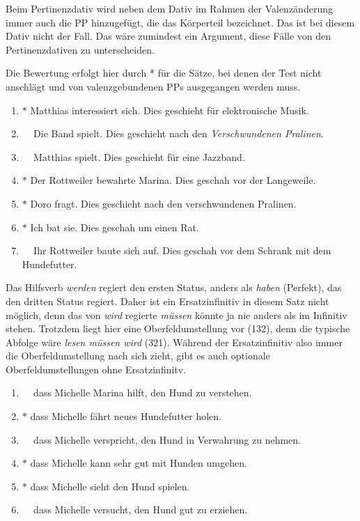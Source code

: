 \label{sol:relationenundpraedikate05}

Beim Pertinenzdativ wird neben dem Dativ im Rahmen der Valenzänderung immer auch die PP hinzugefügt, die das Körperteil bezeichnet.
Das ist bei diesem Dativ nicht der Fall.
Das wäre zumindest ein Argument, diese Fälle von den Pertinenzdativen zu unterscheiden.

\label{sol:relationenundpraedikate06}

Die Bewertung erfolgt hier durch * für die Sätze, bei denen der Test nicht anschlägt und von valenzgebundenen PPs ausgegangen werden muss.

\begin{enumerate}
  \item $*$ Matthias interessiert sich. Dies geschieht für elektronische Musik.
  \item $\phantom{*}$ Die Band spielt. Dies geschieht nach den \textit{Verschwundenen Pralinen}.
  \item $\phantom{*}$ Matthias spielt. Dies geschieht für eine Jazzband.
  \item $*$ Der Rottweiler bewahrte Marina. Dies geschah vor der Langeweile.
  \item $*$ Doro fragt. Dies geschieht nach den verschwundenen Pralinen.
  \item $*$ Ich bat sie. Dies geschah um einen Rat.
  \item $\phantom{*}$ Ihr Rottweiler baute sich auf. Dies geschah vor dem Schrank mit dem Hundefutter.
\end{enumerate}

\label{sol:relationenundpraedikate07}

Das Hilfsverb \textit{werden} regiert den ersten Status, anders als \textit{haben} (Perfekt), das den dritten Status regiert.
Daher ist ein Ersatzinfinitiv in diesem Satz nicht möglich, denn das von \textit{wird} regierte \textit{müssen} könnte ja nie anders als im Infinitiv stehen.
Trotzdem liegt hier eine Oberfeldumstellung vor (132), denn die typische Abfolge wäre \textit{lesen müssen wird} (321).
Während der Ersatzinfinitiv also immer die Oberfeldumstellung nach sich zieht, gibt es auch optionale Oberfeldumstellungen ohne Ersatzinfinitv.

\label{sol:relationenundpraedikate08}

\begin{enumerate}
  \item $\phantom{*}$ dass Michelle Marina hilft, den Hund zu verstehen.
  \item $*$ dass Michelle fährt neues Hundefutter holen.
  \item $\phantom{*}$ dass Michelle verspricht, den Hund in Verwahrung zu nehmen.
  \item $*$ dass Michelle kann sehr gut mit Hunden umgehen.
  \item $*$ dass Michelle sieht den Hund spielen.
  \item $\phantom{*}$ dass Michelle versucht, den Hund gut zu erziehen.
\end{enumerate}

